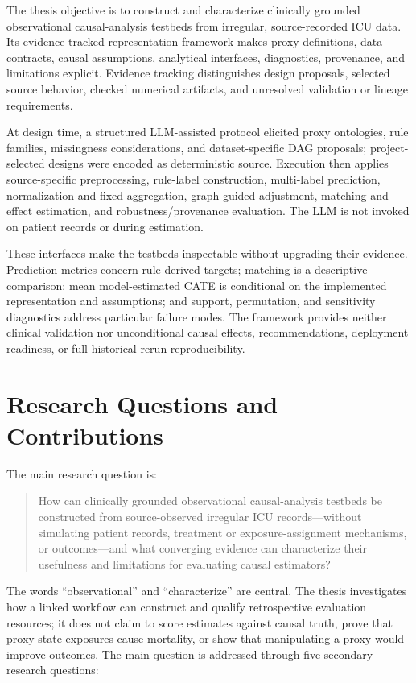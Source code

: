 The thesis objective is to construct and characterize clinically grounded observational causal-analysis testbeds from irregular, source-recorded ICU data.  Its evidence-tracked representation framework makes proxy definitions, data contracts, causal assumptions, analytical interfaces, diagnostics, provenance, and limitations explicit.  Evidence tracking distinguishes design proposals, selected source behavior, checked numerical artifacts, and unresolved validation or lineage requirements.

At design time, a structured LLM-assisted protocol elicited proxy ontologies, rule families, missingness considerations, and dataset-specific DAG proposals; project-selected designs were encoded as deterministic source.  Execution then applies source-specific preprocessing, rule-label construction, multi-label prediction, normalization and fixed aggregation, graph-guided adjustment, matching and effect estimation, and robustness/provenance evaluation.  The LLM is not invoked on patient records or during estimation.

These interfaces make the testbeds inspectable without upgrading their evidence.  Prediction metrics concern rule-derived targets; matching is a descriptive comparison; mean model-estimated CATE is conditional on the implemented representation and assumptions; and support, permutation, and sensitivity diagnostics address particular failure modes.  The framework provides neither clinical validation nor unconditional causal effects, recommendations, deployment readiness, or full historical rerun reproducibility.

\section{Research Questions and Contributions}
\label{sec:introduction:research-questions-contributions}

The main research question is:

\begin{quote}
How can clinically grounded observational causal-analysis testbeds be constructed from source-observed irregular ICU records---without simulating patient records, treatment or exposure-assignment mechanisms, or outcomes---and what converging evidence can characterize their usefulness and limitations for evaluating causal estimators?
\end{quote}

The words ``observational'' and ``characterize'' are central.  The thesis investigates how a linked workflow can construct and qualify retrospective evaluation resources; it does not claim to score estimates against causal truth, prove that proxy-state exposures cause mortality, or show that manipulating a proxy would improve outcomes.  The main question is addressed through five secondary research questions:

